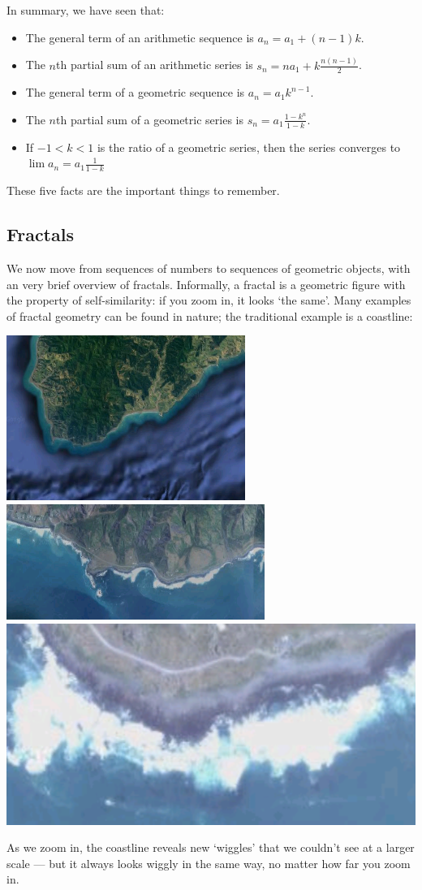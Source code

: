 In summary, we have seen that:
\begin{itemize}
  \item The general term of an arithmetic sequence is $ a_n = a_1 + (n - 1)k $.
  \item The $ n$th partial sum of an arithmetic series is $ s_n =  na_1 + k \frac{n(n - 1)}{2} $.
  \item The general term of a geometric sequence is $ a_n = a_1 k^{n - 1} $.
  \item The $ n$th partial sum of a geometric series is $ s_n = a_1 \frac{1 - k^n}{1 - k}$.
  \item If $ -1 < k < 1 $ is the ratio of a geometric series, then the series converges to $ \lim a_n = a_1 \frac{1}{1 - k}$
\end{itemize}
These five facts are the important things to remember.

\clearpage
\subsection*{Fractals}
We now move from sequences of numbers to sequences of geometric objects, with an very brief overview of fractals. Informally,
a fractal is a geometric figure with the property of self-similarity: if you zoom in, it looks `the same'. Many examples of
fractal geometry can be found in nature; the traditional example is a coastline:
\begin{center}
  \includegraphics[height=0.15\textwidth]{coast1}
  \includegraphics[height=0.15\textwidth]{coast2}
  \includegraphics[height=0.15\textwidth]{coast3}
\end{center}
As we zoom in, the coastline reveals new `wiggles' that we couldn't see at a larger scale --- but it always looks wiggly in the same way, no
matter how far you zoom in.

